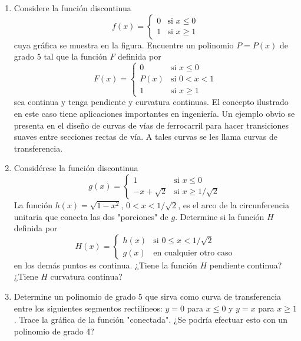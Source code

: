 \item 
    \begin{enumerate}
        \item Considere la función discontinua
        \[
        f(x) = \begin{cases} 
              0 & \text{si } x \le 0 \\
              1 & \text{si } x \ge 1
           \end{cases}
        \]
        cuya gráfica se muestra en la figura. Encuentre un polinomio $P = P(x)$ de grado 5 tal que la función $F$ definida por
        \[
        F(x) = \begin{cases} 
              0 & \text{si } x \le 0 \\
              P(x) & \text{si } 0 < x < 1 \\
              1 & \text{si } x \ge 1
           \end{cases}
        \]
        sea continua y tenga pendiente y curvatura continuas. El concepto ilustrado en este caso tiene aplicaciones importantes en ingeniería. Un ejemplo obvio se presenta en el diseño de curvas de vías de ferrocarril para hacer transiciones suaves entre secciones rectas de vía. A tales curvas se les llama curvas de transferencia.
        \item Considérese la función discontinua
        \[
        g(x) = \begin{cases} 
              1 & \text{si } x \le 0 \\
              -x + \sqrt{2} & \text{si } x \ge 1/\sqrt{2}
           \end{cases}
        \]
        La función $h(x) = \sqrt{1 - x^2}$, $0 < x < 1/\sqrt{2}$, es el arco de la circunferencia unitaria que conecta las dos "porciones" de $g$. Determine si la función $H$ definida por
        \[
        H(x) = \begin{cases} 
              h(x) & \text{si } 0 \le x < 1/\sqrt{2} \\
              g(x) & \text{en cualquier otro caso}
           \end{cases}
        \]
        en los demás puntos es continua. ¿Tiene la función $H$ pendiente continua? ¿Tiene $H$ curvatura continua?
        \item Determine un polinomio de grado 5 que sirva como curva de transferencia entre los siguientes segmentos rectilíneos: $y = 0$ para $x \le 0$ y $y = x$ para $x \ge 1$. Trace la gráfica de la función "conectada". ¿Se podría efectuar esto con un polinomio de grado 4?
    \end{enumerate}
